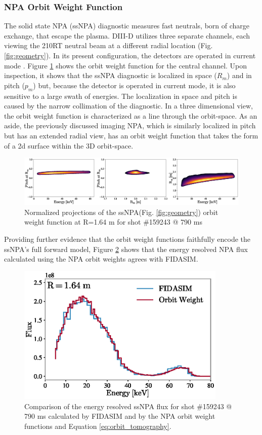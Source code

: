 \subsubsection{NPA Orbit Weight Function}
The solid state NPA (ssNPA) diagnostic measures fast neutrals, born of charge exchange, that escape the plasma. DIII-D utilizes three separate channels, each viewing the 210RT neutral beam at a different radial location (Fig. \ref{fig:geometry}). In its present configuration, the detectors are operated in current mode \cite{ssNPA2012}.
Figure \ref{fig:npa_orbit_weight} shows the orbit weight function for the central channel. Upon inspection, it shows that the ssNPA diagnostic is localized in space ($R_m$) and in pitch ($p_m$) but, because the detector is operated in current mode, it is also sensitive to a large swath of energies. The localization in space and pitch is caused by the narrow collimation of the diagnostic. In a three dimensional view, the orbit weight function is characterized as a line through the orbit-space. As an aside, the previously discussed imaging NPA\cite{du2018inpa}, which is similarly localized in pitch but has an extended radial view, has an orbit weight function that takes the form of a 2d surface within the 3D orbit-space.
\begin{figure}[h!]
    \centering
    \includegraphics[width=15cm]{figures/npa_orbit_weight_2.eps}
    \caption{Normalized projections of the ssNPA(Fig. \ref{fig:geometry}) orbit weight function at R=1.64 m for shot \#159243 @ 790 ms}
    \label{fig:npa_orbit_weight}
\end{figure}

Providing further evidence that the orbit weight functions faithfully encode the ssNPA's full forward model, Figure \ref{fig:npa_ow_flux} shows that the energy resolved NPA flux calculated using the NPA orbit weights agrees with FIDASIM. 
\begin{figure}[h!]
    \centering
    \includegraphics[width=10cm]{figures/npa_flux.eps}
    \caption{Comparison of the energy resolved ssNPA flux for shot \#159243 @ 790 ms calculated by FIDASIM and by the NPA orbit weight functions and Equation \ref{eq:orbit_tomography}.}
    \label{fig:npa_ow_flux}
\end{figure}

